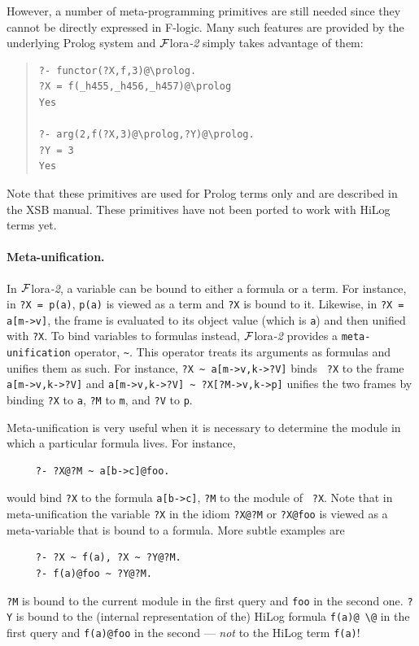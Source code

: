 \documentclass[11pt]{article}
\newcommand{\FLORA}{{\mbox{\sc ${\cal F}${lora}\rm\emph{-2}}}\xspace}
\newcommand{\FLSYSTEM}{\FLORA}
\newcommand{\bs}{\textbackslash}
\newcommand{\fl}{\mbox{F-logic}\xspace}
\begin{document}
However, a number of meta-programming primitives are still needed
since they cannot be directly expressed in \fl. Many such features are
provided by the underlying Prolog system and \FLSYSTEM simply takes advantage of
them: 
\begin{quote}
\begin{verbatim}
?- functor(?X,f,3)@\prolog.
?X = f(_h455,_h456,_h457)@\prolog
Yes

?- arg(2,f(?X,3)@\prolog,?Y)@\prolog.
?Y = 3
Yes
\end{verbatim}
\end{quote}
Note that these primitives are used for Prolog terms only and
are described in the XSB manual. These primitives have not been ported to
work with HiLog terms yet.

\paragraph{Meta-unification.}
In \FLSYSTEM, a variable can be bound to either a formula or a term. For instance,
in {\tt ?X = p(a)}, {\tt p(a)} is viewed as a term and {\tt ?X} is bound to
it. Likewise, in {\tt ?X = a[m->v]}, the frame is evaluated to its
object value (which is {\tt a}) and then unified with {\tt ?X}. To bind
variables to formulas instead, \FLSYSTEM provides a {\tt meta-unification}
operator, \verb|~|.  This operator treats its arguments as formulas and
unifies them as such. For instance, {\tt ?X \verb|~| a[m->v,k->?V]} binds {\tt
  ?X} to the frame {\tt a[m->v,k->?V]} and {\tt a[m->v,k->?V] \verb|~|
  ?X[?M->v,k->p]} unifies the two frames by binding {\tt ?X} to {\tt a},
{\tt ?M} to {\tt m}, and {\tt ?V} to {\tt p}.

Meta-unification is very useful when it is necessary to determine the module
in which a particular formula lives. For instance,
\begin{verbatim}
     ?- ?X@?M ~ a[b->c]@foo.  
\end{verbatim}
would bind {\tt ?X} to the formula {\tt a[b->c]},  {\tt ?M} to the module of {\tt
?X}. Note that in meta-unification the variable {\tt ?X} in the idiom
\verb|?X@?M| or \verb|?X@foo| is viewed as a meta-variable that is bound to
a formula.  More subtle examples are
\begin{verbatim}
     ?- ?X ~ f(a), ?X ~ ?Y@?M.  
     ?- f(a)@foo ~ ?Y@?M.
\end{verbatim}
{\tt ?M} is bound to the current module in the first query and {\tt foo} in the
second one. {\tt ?Y} is bound to the (internal representation of the)
HiLog formula {\tt f(a)@ \bs{}@} in the first query and {\tt f(a)@foo} in
the second --- \emph{not} to the HiLog term {\tt f(a)}!
\end{document}
